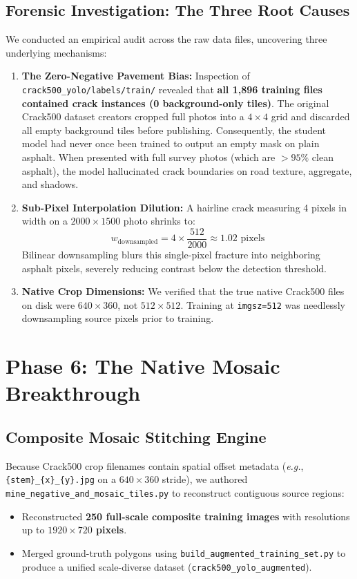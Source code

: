 \documentclass[11pt,a4paper]{article}
\newcommand{\eg}{\textit{e.g.}}
\begin{document}
\subsection{Forensic Investigation: The Three Root Causes}
We conducted an empirical audit across the raw data files, uncovering three underlying mechanisms:
\begin{enumerate}[leftmargin=1.5em]
  \item \textbf{The Zero-Negative Pavement Bias:} 
  Inspection of \texttt{crack500\_yolo/labels/train/} revealed that \textbf{all 1,896 training files contained crack instances (0 background-only tiles)}. 
  The original Crack500 dataset creators cropped full photos into a $4\times4$ grid and discarded all empty background tiles before publishing. 
  Consequently, the student model had never once been trained to output an empty mask on plain asphalt. When presented with full survey photos (which are $>95\%$ clean asphalt), the model hallucinated crack boundaries on road texture, aggregate, and shadows.
  \item \textbf{Sub-Pixel Interpolation Dilution:} 
  A hairline crack measuring 4 pixels in width on a $2000\times1500$ photo shrinks to:
  \begin{equation}
    w_{\text{downsampled}} = 4 \times \frac{512}{2000} \approx 1.02\text{ pixels}
  \end{equation}
  Bilinear downsampling blurs this single-pixel fracture into neighboring asphalt pixels, severely reducing contrast below the detection threshold.
  \item \textbf{Native Crop Dimensions:} 
  We verified that the true native Crack500 files on disk were $640\times360$, not $512\times512$. Training at \texttt{imgsz=512} was needlessly downsampling source pixels prior to training.
\end{enumerate}

\section{Phase 6: The Native Mosaic Breakthrough}
\label{sec:phase6}

\subsection{Composite Mosaic Stitching Engine}
Because Crack500 crop filenames contain spatial offset metadata (\eg, \texttt{\{stem\}\_\{x\}\_\{y\}.jpg} on a $640\times360$ stride), we authored \texttt{mine\_negative\_and\_mosaic\_tiles.py} to reconstruct contiguous source regions:
\begin{itemize}[leftmargin=1.5em]
  \item Reconstructed \textbf{250 full-scale composite training images} with resolutions up to \textbf{$1920\times720$ pixels}.
  \item Merged ground-truth polygons using \texttt{build\_augmented\_training\_set.py} to produce a unified scale-diverse dataset (\texttt{crack500\_yolo\_augmented}).
\end{itemize}
\end{document}
